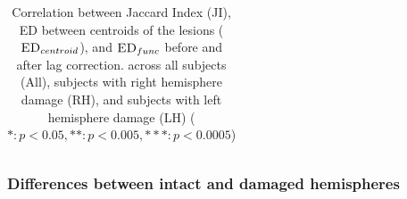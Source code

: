 \documentclass[fleqn,10pt]{wlscirep}
\begin{document}
\begin{table}[]
{\begin{tabular}{@{}llllllllllllllll@{}}
\end{tabular}}
\caption{Correlation between Jaccard Index (JI), ED between centroids of the lesions ($\textsc{ED}_{{centroid}}$), and $\textsc{ED}_{{func}}$ before and after lag correction. across  all subjects (All), subjects with right hemisphere damage (RH), and subjects with left hemisphere damage (LH) ($*: p<0.05, **: p<0.005, ***: p<0.0005 $)}
\label{tbl:EDcentroid}
\end{table}

\subsubsection*{Differences between intact and damaged hemispheres}
\end{document}
